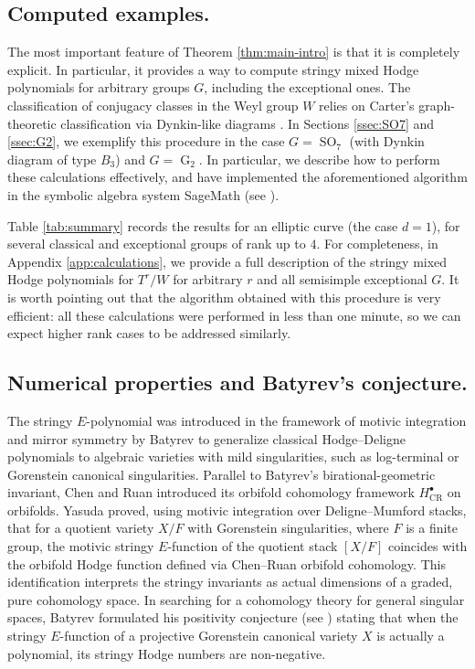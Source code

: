 \documentclass[11pt,english]{amsart}
\numberwithin{equation}{section}
\numberwithin{figure}{section}
\theoremstyle{plain}
\theoremstyle{plain}
\theoremstyle{definition}
\theoremstyle{remark}
\newcommand{\SO}{\operatorname{SO}}
\newcommand{\G}{\operatorname{G}}
\begin{document}
\subsection*{Computed examples.} The most important feature of Theorem \ref{thm:main-intro} is that it is completely explicit. In particular, it provides a way to compute stringy mixed Hodge polynomials for arbitrary groups $G$, including the exceptional ones. The classification of conjugacy classes in the Weyl group $W$ relies on Carter's graph-theoretic classification via Dynkin-like diagrams \cite{Carter1972}. In Sections \ref{ssec:SO7} and \ref{ssec:G2}, we exemplify this procedure in the case $G = \SO_7$ (with Dynkin diagram of type $B_3$) and $G = \G_2$. In particular, we describe how to perform these calculations effectively, and have implemented the aforementioned algorithm in the symbolic algebra system SageMath (see \cite{code_repository}).

Table \ref{tab:summary} records the results for an elliptic curve (the case $d=1$), for several classical and exceptional groups of rank up to $4$. For completeness, in Appendix \ref{app:calculations}, we provide a full description of the stringy mixed Hodge polynomials for $T^r/W$ for arbitrary $r$ and all semisimple exceptional $G$. It is worth pointing out that the algorithm obtained with this procedure is very efficient: all these calculations were performed in less than one minute, so we can expect higher rank cases to be addressed similarly.

\subsection*{Numerical properties and Batyrev's conjecture.}

The stringy $E$-polynomial was introduced in the framework of motivic integration and mirror symmetry by Batyrev \cite{Ba} to generalize classical Hodge--Deligne polynomials to algebraic varieties with mild singularities, such as log-terminal or Gorenstein canonical singularities. Parallel to Batyrev's birational-geometric invariant, Chen and Ruan introduced its orbifold cohomology framework $H^\bullet_{\mathrm{CR}}$ on orbifolds. Yasuda \cite{Ya} proved, using motivic integration over Deligne--Mumford stacks, that for a quotient variety $X/F$ with Gorenstein singularities, where $F$ is a finite group, the motivic stringy $E$-function of the quotient stack $[X/F]$ coincides with the orbifold Hodge function defined via Chen--Ruan orbifold cohomology.
This identification interprets the stringy invariants as actual dimensions of a graded, pure cohomology space.
In searching for a cohomology theory for general singular spaces, Batyrev formulated his positivity conjecture (see \cite[Conjecture 3.10]{Ba}) stating that when the stringy $E$-function of a projective Gorenstein canonical variety $X$ is actually a polynomial, its stringy Hodge numbers are non-negative.
\end{document}
